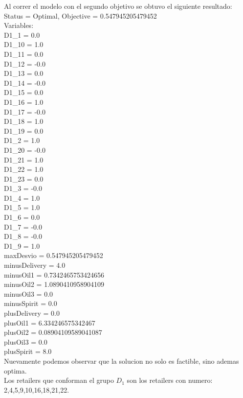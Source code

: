 Al correr el modelo con el segundo objetivo se obtuvo el siguiente resultado: \\
Status = Optimal, Objective = 0.547945205479452 \\
Variables: \\
D1\_1 = 0.0 \\
D1\_10 = 1.0 \\
D1\_11 = 0.0 \\
D1\_12 = -0.0 \\
D1\_13 = 0.0 \\
D1\_14 = -0.0 \\
D1\_15 = 0.0 \\
D1\_16 = 1.0 \\
D1\_17 = -0.0 \\
D1\_18 = 1.0 \\
D1\_19 = 0.0 \\
D1\_2 = 1.0 \\
D1\_20 = -0.0 \\
D1\_21 = 1.0 \\
D1\_22 = 1.0 \\
D1\_23 = 0.0 \\
D1\_3 = -0.0 \\
D1\_4 = 1.0 \\
D1\_5 = 1.0 \\
D1\_6 = 0.0 \\
D1\_7 = -0.0 \\
D1\_8 = -0.0 \\
D1\_9 = 1.0 \\
maxDesvio = 0.547945205479452 \\
minusDelivery = 4.0 \\
minusOil1 = 0.7342465753424656 \\
minusOil2 = 1.0890410958904109 \\
minusOil3 = 0.0 \\
minusSpirit = 0.0 \\
plusDelivery = 0.0 \\
plusOil1 = 6.334246575342467 \\
plusOil2 = 0.08904109589041087 \\
plusOil3 = 0.0 \\
plusSpirit = 8.0 \\
Nuevamente podemos observar que la solucion no solo es factible, sino ademas optima.\\
Los retailers que conforman el grupo $D_1$ son los retailers con numero: 2,4,5,9,10,16,18,21,22.
